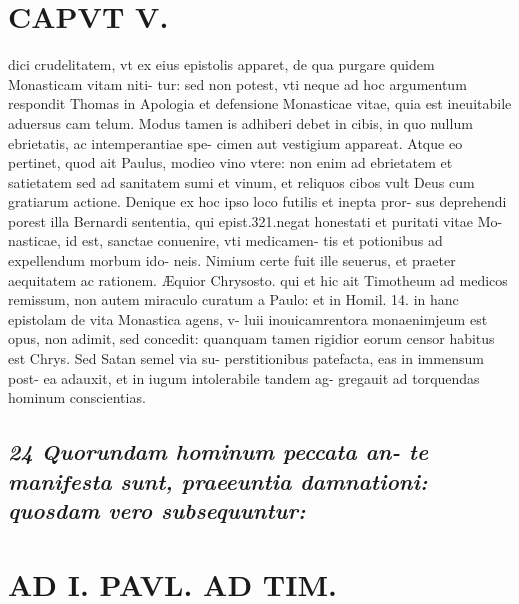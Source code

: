 \documentclass{article}
\begin{document}
\begin{pages}
\section*{CAPVT V. }
\marginpar{[ p.383 ]}\pstart dici crudelitatem, vt ex eius epistolis apparet, de qua purgare quidem Monasticam vitam niti- tur: sed non potest, vti neque ad hoc argumentum respondit Thomas in Apologia et defensione Monasticae vitae, quia est ineuitabile aduersus cam telum. Modus tamen is adhiberi debet in cibis, in quo nullum ebrietatis, ac intemperantiae spe- cimen aut vestigium appareat.  \pend\pstart Atque eo pertinet, quod ait Paulus, modieo vino vtere: non enim ad ebrietatem et satietatem sed ad sanitatem sumi et vinum, et reliquos cibos vult Deus cum gratiarum actione.  \pend\pstart Denique  ex hoc ipso loco futilis et inepta pror- sus deprehendi porest illa Bernardi sententia, qui epist.321.negat honestati et puritati vitae Mo- nasticae, id est, sanctae conuenire, vti medicamen- tis et potionibus ad expellendum morbum ido- neis. Nimium certe fuit ille seuerus, et praeter aequitatem ac rationem. Æquior Chrysosto. qui et hic ait Timotheum ad medicos remissum, non autem miraculo curatum a Paulo: et in Homil. 14. in hanc epistolam de vita Monastica agens, v- luii inouicamrentora monaenimjeum est opus, non adimit, sed concedit: quanquam tamen rigidior eorum censor habitus est Chrys. Sed Satan semel via su- perstitionibus patefacta, eas in immensum post- ea adauxit, et in iugum intolerabile tandem ag- gregauit ad torquendas hominum conscientias.  \pend
{}
{}
\subsection*{\textit{24 Quorundam hominum peccata an- te manifesta sunt, praeeuntia damnationi: quosdam vero subsequuntur: }}
\section*{AD I. PAVL. AD TIM. }
\marginpar{[ p.324 ]}
{}

\end{pages}
\end{document}
